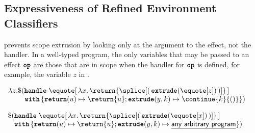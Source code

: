 
\subsection{Expressiveness of Refined Environment Classifiers}\label{subsection:rec-formal-expressiveness}
\recLang{} prevents scope extrusion by looking only at the argument to the effect, not the handler. In a well-typed \recLang{} program, the only variables that may be passed to an effect $\textbf{\texttt{op}}$ are those that are in scope when the handler for $\textbf{\texttt{op}}$ is defined, for example, the variable $z$ in .

\begin{code}
\begin{rec}
$\begin{array}{l}
  \lambda z. \$(\textbf{\texttt{handle}} \; \equote[\, {\lambda x. \, \return{\splice[( \, {{\textbf{\texttt{extrude}}(\equote[z])}} \, )]}} \,] \\
  \quad \quad \,\, \textbf{\texttt{with}} \, \{ \textbf{\texttt{return}}(u) \mapsto {\return{u}}; \textbf{\texttt{extrude}}(y, k) \mapsto {\continue{k}{()}}\})
\end{array}$
\end{rec}
%
\label{listing:refined-environment-classifiers-safe}
\end{code}

\begin{code}
\begin{rec}
$\begin{array}{l}
  \$ (\textbf{\texttt{handle}} \; \equote[\, {\lambda x. \, \return{\splice[(\, {{\textbf{\texttt{extrude}}(\equote[x])}} \, )]}} \, ] \\
  \;\;\,\, \textbf{\texttt{with}} \, \{ \textbf{\texttt{return}}(u) \mapsto {\return{u}}; \textbf{\texttt{extrude}}(y, k) \mapsto {\underline{\textsf{any arbitrary program}}}\})
\end{array}$
\end{rec}
%
\label{listing:refined-environment-classifiers-expressiveness}
\end{code}

